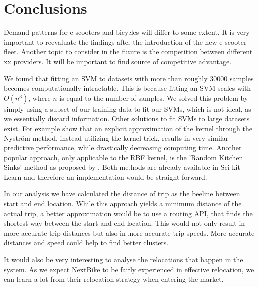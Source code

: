 \section{Conclusions}
\label{sec:conclusions}

Demand patterns for e-scooters and bicycles will differ to some extent. It is very important to reevaluate the findings after the introduction of the new e-scooter fleet. Another topic to consider in the future is the competition between different xx providers. It will be important to find source of competitive advantage. 



We found that fitting an SVM to datasets with more than roughly \(30000\) samples becomes computationally intractable.
This is because fitting an SVM scales with \(O(n^3)\), where \(n\) is equal to the number of samples.
We solved this problem by simply using a subset of our training data to fit our SVMs, which is not ideal, as we essentially discard information.
Other solutions to fit SVMs to large datasets exist. For example   show that an explicit approximation of the kernel through the Nyström method, instead utilizing the kernel-trick,  results in very similar predictive performance, while drastically decreasing computing time. Another popular approach, only applicable to the RBF kernel, is the 'Random Kitchen Sinks' method as proposed by . Both methods are already available in Sci-kit Learn and therefore an implementation would be straight forward.

In our analysis we have calculated the distance of trip as the beeline between start and end location. 
While this approach yields a minimum distance of the actual trip, a better approximation would be to use a routing API, that finds the shortest way between the start and end location. 
This would not only result in more accurate trip distances but also in more accurate trip speeds. 
More accurate distances and speed could help to find better clusters.

It would also be very interesting to analyse the relocations that happen in the system.
As we expect NextBike to be fairly experienced in effective relocation, we can learn a lot from their relocation strategy when entering the market.

